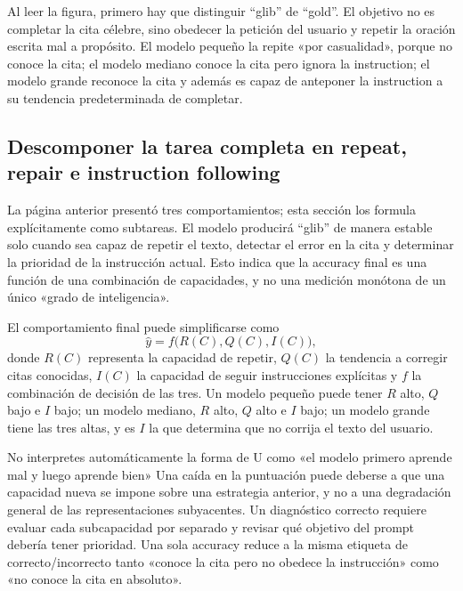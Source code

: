 
Al leer la figura, primero hay que distinguir ``glib'' de ``gold''. El objetivo no es completar la cita célebre, sino obedecer la petición del usuario y repetir la oración escrita mal a propósito. El modelo pequeño la repite «por casualidad», porque no conoce la cita; el modelo mediano conoce la cita pero ignora la instruction; el modelo grande reconoce la cita y además es capaz de anteponer la instruction a su tendencia predeterminada de completar.

\subsection{Descomponer la tarea completa en repeat, repair e instruction following}

La página anterior presentó tres comportamientos; esta sección los formula explícitamente como subtareas. El modelo producirá ``glib'' de manera estable solo cuando sea capaz de repetir el texto, detectar el error en la cita y determinar la prioridad de la instrucción actual. Esto indica que la accuracy final es una función de una combinación de capacidades, y no una medición monótona de un único «grado de inteligencia».


El comportamiento final puede simplificarse como
\[
\hat{y}=f\bigl(R(C),Q(C),I(C)\bigr),
\]
donde $R(C)$ representa la capacidad de repetir, $Q(C)$ la tendencia a corregir citas conocidas, $I(C)$ la capacidad de seguir instrucciones explícitas y $f$ la combinación de decisión de las tres. Un modelo pequeño puede tener $R$ alto, $Q$ bajo e $I$ bajo; un modelo mediano, $R$ alto, $Q$ alto e $I$ bajo; un modelo grande tiene las tres altas, y es $I$ la que determina que no corrija el texto del usuario.

\begin{warningbox}{No interpretes automáticamente la forma de U como «el modelo primero aprende mal y luego aprende bien»}
Una caída en la puntuación puede deberse a que una capacidad nueva se impone sobre una estrategia anterior, y no a una degradación general de las representaciones subyacentes. Un diagnóstico correcto requiere evaluar cada subcapacidad por separado y revisar qué objetivo del prompt debería tener prioridad. Una sola accuracy reduce a la misma etiqueta de correcto/incorrecto tanto «conoce la cita pero no obedece la instrucción» como «no conoce la cita en absoluto».
\end{warningbox}

